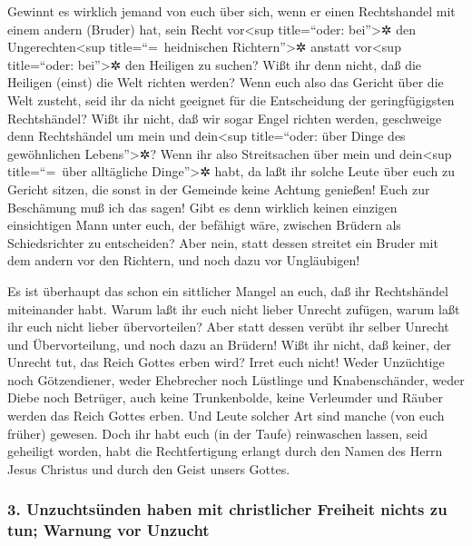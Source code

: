  Gewinnt es wirklich jemand von euch über sich, wenn er
einen Rechtshandel mit einem andern (Bruder) hat, sein Recht
vor\textless sup title=``oder: bei''\textgreater✲ den
Ungerechten\textless sup title=``=~heidnischen Richtern''\textgreater✲
anstatt vor\textless sup title=``oder: bei''\textgreater✲ den Heiligen
zu suchen?  Wißt ihr denn nicht, daß die Heiligen (einst)
die Welt richten werden? Wenn euch also das Gericht über die Welt
zusteht, seid ihr da nicht geeignet für die Entscheidung der
geringfügigsten Rechtshändel?  Wißt ihr nicht, daß wir
sogar Engel richten werden, geschweige denn Rechtshändel um mein und
dein\textless sup title=``oder: über Dinge des gewöhnlichen
Lebens''\textgreater✲?  Wenn ihr also Streitsachen über
mein und dein\textless sup title=``=~über alltägliche
Dinge''\textgreater✲ habt, da laßt ihr solche Leute über euch zu Gericht
sitzen, die sonst in der Gemeinde keine Achtung genießen! 
Euch zur Beschämung muß ich das sagen! Gibt es denn wirklich keinen
einzigen einsichtigen Mann unter euch, der befähigt wäre, zwischen
Brüdern als Schiedsrichter zu entscheiden?  Aber nein,
statt dessen streitet ein Bruder mit dem andern vor den Richtern, und
noch dazu vor Ungläubigen!

 Es ist überhaupt das schon ein sittlicher Mangel an euch,
daß ihr Rechtshändel miteinander habt. Warum laßt ihr euch nicht lieber
Unrecht zufügen, warum laßt ihr euch nicht lieber übervorteilen?
 Aber statt dessen verübt ihr selber Unrecht und
Übervorteilung, und noch dazu an Brüdern!  Wißt ihr nicht,
daß keiner, der Unrecht tut, das Reich Gottes erben wird? Irret euch
nicht! Weder Unzüchtige noch Götzendiener, weder Ehebrecher noch
Lüstlinge und Knabenschänder,  weder Diebe noch Betrüger,
auch keine Trunkenbolde, keine Verleumder und Räuber werden das Reich
Gottes erben.  Und Leute solcher Art sind manche (von
euch früher) gewesen. Doch ihr habt euch (in der Taufe) reinwaschen
lassen, seid geheiligt worden, habt die Rechtfertigung erlangt durch den
Namen des Herrn Jesus Christus und durch den Geist unsers Gottes.

\hypertarget{unzuchtsuxfcnden-haben-mit-christlicher-freiheit-nichts-zu-tun-warnung-vor-unzucht}{%
\subsubsection{3. Unzuchtsünden haben mit christlicher Freiheit nichts
zu tun; Warnung vor
Unzucht}\label{unzuchtsuxfcnden-haben-mit-christlicher-freiheit-nichts-zu-tun-warnung-vor-unzucht}}

